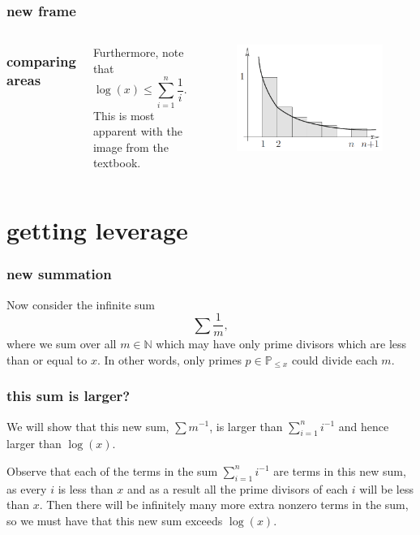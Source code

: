 \documentclass[mathserif]{beamer}
\begin{document}
\begin{frame}
  \frametitle{new frame}

  \begin{columns}
    \frametitle{comparing areas}
    Furthermore, note that \[\log(x)\leq \sum_{i=1}^n\frac{1}{i}.\] This is most apparent with the image from the textbook.
    
    \begin{figure}[h]
      \centering
      \includegraphics[scale=0.4]{areas}
    \end{figure}
  \end{columns}
\end{frame}

\section{getting leverage}

\begin{frame}
  \frametitle{new summation}
  Now consider the infinite sum \[\sum \frac{1}{m},\] where we sum over all $m\in \mathbb{N}$ which may have only prime divisors which are less than or equal to $x$. In other words, only primes $p\in\mathbb{P}_{\leq x}$ could divide each $m$.
\end{frame}

\begin{frame}
  \frametitle{this sum is larger?}
  We will show that this new sum, $\sum m^{-1}$, is larger than $\sum_{i=1}^n i^{-1}$ and hence larger than $\log(x)$.

  Observe that each of the terms in the sum $\sum_{i=1}^n i^{-1}$ are terms in this new sum, as every $i$ is less than $x$ and as a result all the prime divisors of each $i$ will be less than $x$. Then there will be infinitely many more extra nonzero terms in the sum, so we must have that this new sum exceeds $\log(x)$.
\end{frame}
\end{document}
